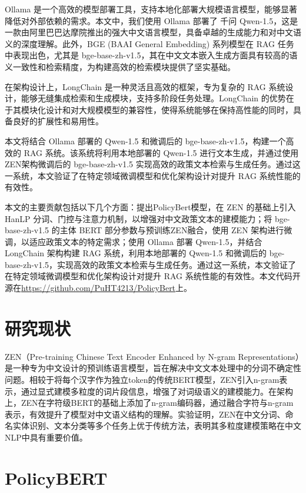 \documentclass[12pt, a4paper]{ctexart}
\begin{document}
Ollama 是一个高效的模型部署工具，支持本地化部署大规模语言模型，能够显著降低对外部依赖的需求。本文中，我们使用 Ollama 部署了 千问 Qwen-1.5，这是一款由阿里巴巴达摩院推出的强大中文语言模型，具备卓越的生成能力和对中文语义的深度理解。此外，BGE (BAAI General Embedding) 系列模型在 RAG 任务中表现出色，尤其是 bge-base-zh-v1.5，其在中文文本嵌入生成方面具有较高的语义一致性和检索精度，为构建高效的检索模块提供了坚实基础。

在架构设计上，LongChain 是一种灵活且高效的框架，专为复杂的 RAG 系统设计，能够无缝集成检索和生成模块，支持多阶段任务处理。LongChain 的优势在于其模块化设计和对大规模模型的兼容性，使得系统能够在保持高性能的同时，具备良好的扩展性和易用性。

本文将结合 Ollama 部署的 Qwen-1.5 和微调后的 bge-base-zh-v1.5，构建一个高效的 RAG 系统。该系统将利用本地部署的 Qwen-1.5 进行文本生成，并通过使用ZEN架构微调后的 bge-base-zh-v1.5 实现高效的政策文本检索与生成任务。通过这一系统，本文验证了在特定领域微调模型和优化架构设计对提升 RAG 系统性能的有效性。

本文的主要贡献包括以下几个方面：提出PolicyBert模型，在 ZEN 的基础上引入 HanLP 分词、门控与注意力机制，以增强对中文政策文本的建模能力；将 bge-base-zh-v1.5 的主体 BERT 部分参数与预训练ZEN融合，使用 ZEN 架构进行微调，以适应政策文本的特定需求；使用 Ollama 部署 Qwen-1.5，并结合 LongChain 架构构建 RAG 系统，利用本地部署的 Qwen-1.5 和微调后的 bge-base-zh-v1.5，实现高效的政策文本检索与生成任务。通过这一系统，本文验证了在特定领域微调模型和优化架构设计对提升 RAG 系统性能的有效性。本文代码开源在\url{https://github.com/PuHT4213/PolicyBert}上。




\section{研究现状}
ZEN（Pre-training Chinese Text Encoder Enhanced by N-gram Representations）是一种专为中文设计的预训练语言模型，旨在解决中文文本处理中的分词不确定性问题\cite{diao-etal-2020-zen}。相较于将每个汉字作为独立token的传统BERT模型，ZEN引入n-gram表示，通过显式建模多粒度的词片段信息，增强了对词级语义的建模能力。在架构上，ZEN在字符级BERT的基础上添加了n-gram编码器，通过融合字符与n-gram表示，有效提升了模型对中文语义结构的理解。实验证明，ZEN在中文分词、命名实体识别、文本分类等多个任务上优于传统方法，表明其多粒度建模策略在中文NLP中具有重要价值。



\section{PolicyBERT}
\end{document}
